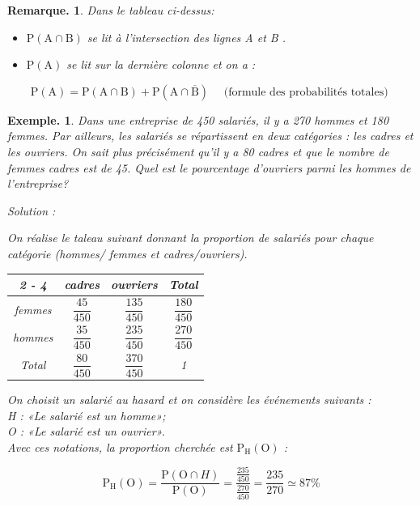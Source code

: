 \documentclass[12pt]{article}
\theoremstyle{break}
\newtheorem*{example}{Exemple.}
\newtheorem*{remark}{Remarque.}
\begin{document}
\begin{remark}
Dans le tableau ci-dessus:

\begin{itemize}
  \item $\mathrm{P}(\mathrm{A} \cap \mathrm{B})$ se lit à l'intersection des lignes A et B .
  \item $\mathrm{P}(\mathrm{A})$ se lit sur la dernière colonne et on a :
\end{itemize}

$$
\mathrm{P}(\mathrm{A})=\mathrm{P}(\mathrm{A} \cap \mathrm{B})+\mathrm{P}(\mathrm{A} \cap \overline{\mathrm{B}}) \quad \text { (formule des probabilités totales) }
$$
\end{remark}

\begin{example}
Dans une entreprise de 450 salariés, il y a 270 hommes et 180 femmes. Par ailleurs, les salariés se répartissent en deux catégories : les cadres et les ouvriers. On sait plus précisément qu'il y a 80 cadres et que le nombre de femmes cadres est de 45. Quel est le pourcentage d'ouvriers parmi les hommes de l'entreprise?

\newpage
Solution :

On réalise le taleau suivant donnant la proportion de salariés pour chaque catégorie (hommes/ femmes et cadres/ouvriers).

\begin{center}
\renewcommand{\arraystretch}{3}
\begin{tabular}{|c|c|c|c|}
\cline { 2 - 4 }
\multicolumn{1}{c|}{} & cadres & ouvriers & Total \\
\hline
femmes & $\dfrac{45}{450}$ & $\dfrac{135}{450}$ & $\dfrac{180}{450}$ \\
\hline
hommes & $\dfrac{35}{450}$ & $\dfrac{235}{450}$ & $\dfrac{270}{450}$ \\
\hline
Total & $\dfrac{80}{450}$ & $\dfrac{370}{450}$ & 1 \\
\hline
\end{tabular}
\end{center}

On choisit un salarié au hasard et on considère les événements suivants :\\
H : «Le salarié est un homme»;\\
O : «Le salarié est un ouvrier».\\
Avec ces notations, la proportion cherchée est $\mathrm{P}_{\mathrm{H}}(\mathrm{O})$ :

$$
\mathrm{P}_{\mathrm{H}}(\mathrm{O})=\frac{\mathrm{P}(\mathrm{O} \cap H)}{\mathrm{P}(\mathrm{O})}=\dfrac{\frac{235}{450}}{\frac{270}{450}}=\dfrac{235}{270} \simeq 87 \%
$$
\end{example}
\end{document}
